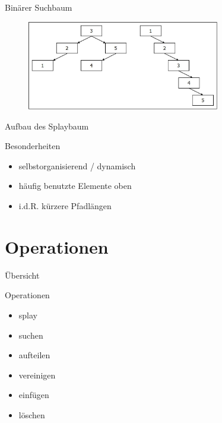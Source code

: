 \documentclass[11pt]{beamer}
\begin{document}
	
		\begin{frame}{Binärer Suchbaum}
			\begin{figure}[h]
				\centering
				\includegraphics[width=0.75\textwidth]{"bilder/SuchbaumEingabefolge"}
			\end{figure}
		\end{frame}
	
		\begin{frame}{Aufbau des Splaybaum}
			\begin{block}{Besonderheiten}
				\pause
			\begin{itemize}
				\item selbstorganisierend / dynamisch
				\pause
				\item häufig benutzte Elemente oben
				\pause
				\item i.d.R. kürzere Pfadlängen
			\end{itemize}
			\end{block}
	
		
		\end{frame}

		
	\section{Operationen}	
	
		\begin{frame} {Übersicht}
			\tableofcontents[currentsection]   
			
		\end{frame}
		
		\begin{frame}{Operationen}
		
			\begin{itemize}
				
				\item splay
				\item \color {gray} suchen
				\item aufteilen
				\item vereinigen
				\item einfügen
				\item löschen
			\end{itemize}
		\end{frame}	
	
\end{document}
